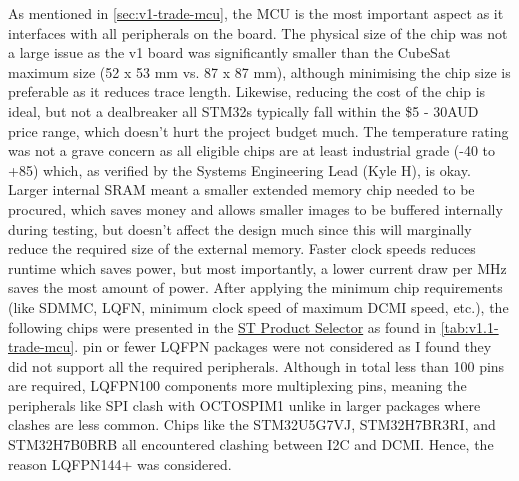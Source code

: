 As mentioned in \autoref{sec:v1-trade-mcu}, the MCU is the most important aspect as it interfaces with all peripherals on the board. The physical size of the chip was not a large issue as the v1 board was significantly smaller than the CubeSat maximum size (52 x 53 mm vs. 87 x 87 mm), although minimising the chip size is preferable as it reduces trace length. Likewise, reducing the cost of the chip is ideal, but not a dealbreaker all STM32s typically fall within the \$5 - 30AUD price range, which doesn't hurt the project budget much. The temperature rating was not a grave concern as all eligible chips are at least industrial grade (-40 to +85) which, as verified by the Systems Engineering Lead (Kyle H), is okay. Larger internal SRAM meant a smaller extended memory chip needed to be procured, which saves money and allows smaller images to be buffered internally during testing, but doesn't affect the design much since this will marginally reduce the required size of the external memory. Faster clock speeds reduces runtime which saves power, but most importantly, a lower current draw per MHz saves the most amount of power. After applying the minimum chip requirements (like SDMMC, LQFN, minimum clock speed of maximum DCMI speed, etc.), the following chips were presented in the \href{https://www.st.com/content/st_com/en/stm32-mcu-product-selector.html}{ST Product Selector} as found in \autoref{tab:v1.1-trade-mcu}.
 pin or fewer LQFPN packages were not considered as I found they did not support all the required peripherals. Although in total less than 100 pins are required, LQFPN100 components more multiplexing pins, meaning the peripherals like SPI clash with OCTOSPIM1 unlike in larger packages where clashes are less common. Chips like the 
STM32U5G7VJ, STM32H7BR3RI, and STM32H7B0BRB all encountered clashing between I2C and DCMI. Hence, the reason LQFPN144+ was considered.

